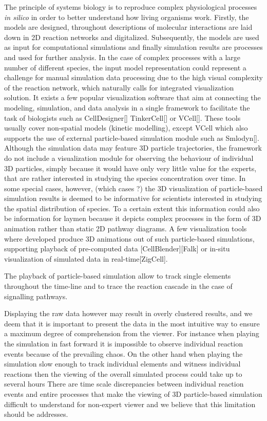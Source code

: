 The principle of systems biology is to reproduce complex physiological processes \textit{in silico} in order to better understand how living organisms work.
Firstly, the models are designed, throughout descriptions of molecular interactions are laid down in 2D reaction networks and digitalized.
Subsequently, the models are used as input for computational simulations and finally simulation results are processes and used for further analysis.
In the case of complex processes with a large number of different species, the input model representation could represent a challenge for manual simulation data processing due to the high visual complexity of the reaction network, which naturally calls for integrated visualization solution.
It exists a few popular visualization software that aim at connecting the modeling, simulation, and data analysis in a single framework to facilitate the task of biologists such as CellDesigner[] TinkerCell[] or VCell[].
These tools usually cover non-spatial models (kinetic modelling), except VCell which also supports the use of external particle-based simulation module such as Smlodyn[].
Although the simulation data may feature 3D particle trajectories, the framework do not include a visualization module for observing the behaviour of individual 3D particles, simply because it would have only very little value for the experts, that are rather interested in studying the species concentration over time.
In some special cases, however, (which cases ?) the 3D visualization of particle-based simulation results is deemed to be informative for scientists interested in studying the spatial distribution of species.
To a certain extent this information could also be information for laymen because it depicts complex processes in the form of 3D animation rather than static 2D pathway diagrams.
A few visualization tools where developed produce 3D animations out of such particle-based simulations, supporting playback of pre-computed data [CellBlender][Falk] or in-situ visualization of simulated data in real-time[ZigCell].

The playback of particle-based simulation allow to track single elements throughout the time-line and to trace the reaction cascade in the case of signalling pathways.

Displaying the raw data however may result in overly clustered results, and we deem that it is important to present the data in the most intuitive way to ensure a maximum degree of comprehension from the viewer.
For instance when playing the simulation in fast forward it is impossible to observe individual reaction events because of the prevailing chaos.
On the other hand when playing the simulation slow enough to track individual elements and witness individual reactions then the viewing of the overall simulated process could take up to several hours
There are time scale discrepancies between individual reaction events and entire processes that make the viewing of 3D particle-based simulation difficult to understand for non-expert viewer and we believe that this limitation should be addresses.

